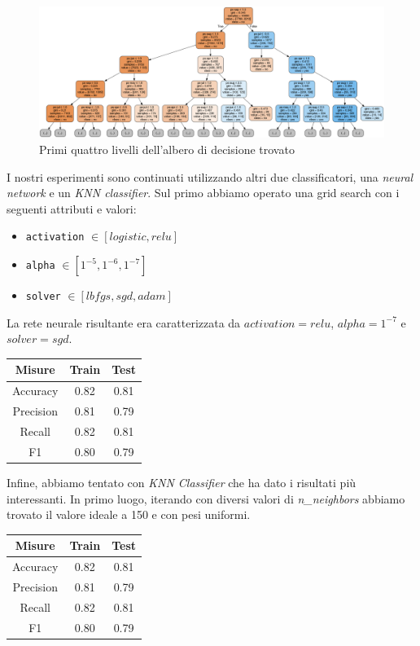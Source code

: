 \begin{figure}[H]
	\centering
	\includegraphics[width=\linewidth]{img/tree.png}
	\caption[LOF entry]{Primi quattro livelli dell'albero di decisione trovato}
	\label{tree}
\end{figure} 

I nostri esperimenti sono continuati utilizzando altri due classificatori,
una \textit{neural network} e un \textit{KNN classifier}. Sul primo
abbiamo operato una grid search con i seguenti attributi e valori:

\begin{itemize}
	\item \texttt{activation} $\in [logistic, relu]$
	\item \texttt{alpha} $\in [1^{-5}, 1^{-6}, 1^{-7}]$
	\item \texttt{solver} $\in [lbfgs, sgd, adam]$
\end{itemize}

La rete neurale risultante era caratterizzata da $activation=relu$,
$alpha=1^{-7}$ e $solver=sgd$.

\begin{center}
	\begin{tabular}{c|c|c}
		\hline
		\textbf{Misure} & \textbf{Train} & \textbf{Test}\\
		\hline
		Accuracy & 0.82 & 0.81\\
		\hline
		Precision & 0.81 & 0.79\\
		\hline
		Recall & 0.82 & 0.81\\
		\hline
		F1 & 0.80 & 0.79\\
		\hline
	\end{tabular}
\end{center}

Infine, abbiamo tentato con \textit{KNN Classifier} che ha dato i risultati
pi\`u interessanti. In primo luogo, iterando con diversi valori di
\textit{n\_neighbors} abbiamo trovato il valore ideale a 150 e con pesi
uniformi.

\begin{center}
	\begin{tabular}{c|c|c}
		\hline
		\textbf{Misure} & \textbf{Train} & \textbf{Test}\\
		\hline
		Accuracy & 0.82 & 0.81\\
		\hline
		Precision & 0.81 & 0.79\\
		\hline
		Recall & 0.82 & 0.81\\
		\hline
		F1 & 0.80 & 0.79\\
		\hline
	\end{tabular}
\end{center}

